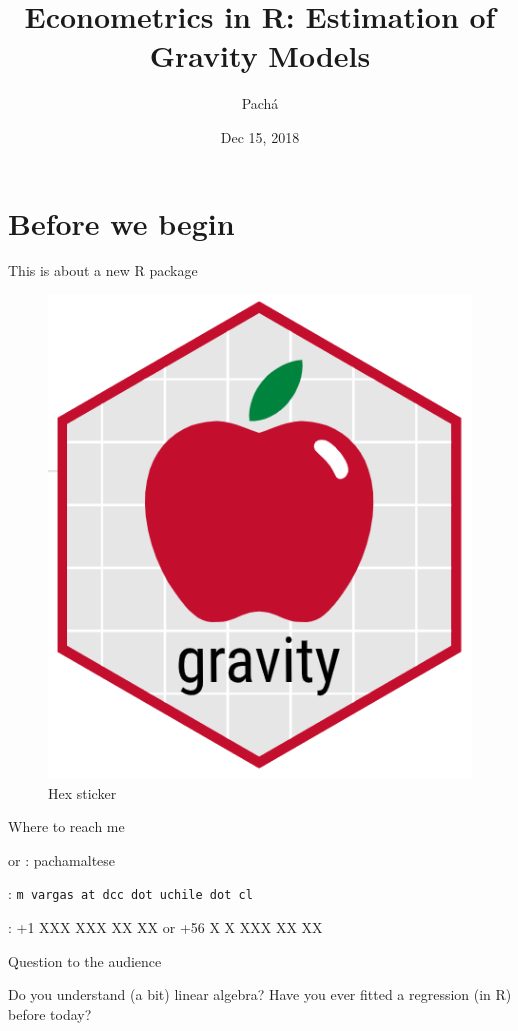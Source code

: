 \documentclass[ignorenonframetext,compress,aspectratio=169]{beamer}
\title{Econometrics in R: Estimation of Gravity Models}
\author{Pachá}
\institute{satRday Santiago}
\date{Dec 15, 2018}
\begin{document}
\frame{\titlepage}

\section{Before we begin}\label{before-we-begin}

\begin{frame}{This is about a new R package}

\begin{figure}
\centering
\includegraphics{hexicon.PNG}
\caption{Hex sticker}
\end{figure}

\end{frame}

\begin{frame}[fragile]{Where to reach me}

\faTwitter or \faGithub: pachamaltese

\faEnvelopeO: \texttt{m\ vargas\ at\ dcc\ dot\ uchile\ dot\ cl}

\faPhone: +1 XXX XXX XX XX or +56 X X XXX XX XX

\end{frame}

\begin{frame}{Question to the audience}

\LARGE{Do you understand (a bit) linear algebra?}
\LARGE{Have you ever fitted a regression (in R) before today?}

\end{frame}
\end{document}
